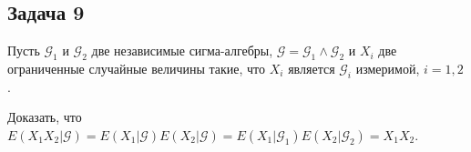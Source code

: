 \documentclass[a4paper,12pt]{article} %
\begin{document}
\subsection*{Задача 9}

Пусть $\mathcal{G}_1$ и $\mathcal{G}_2$ две независимые сигма-алгебры, $\mathcal{G} = \mathcal{G}_1 \wedge \mathcal{G}_2 $ и $X_i$  две
ограниченные случайные величины такие, что $X_i$   является $\mathcal{G}_i$  измеримой, $i = 1,2$.

Доказать, что
$E(X_1 X_2  |\mathcal{G}) = E(X_1 |\mathcal{G}) E(X_2  |\mathcal{G}) = E(X_1 |\mathcal{G}_1 )E(X_2 | \mathcal{G}_2 ) = X_1X_2$.
\end{document}
